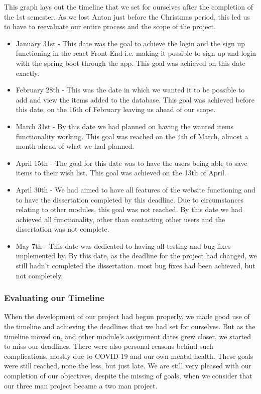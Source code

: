 This graph lays out the timeline that we set for ourselves after the completion of the 1st semester. As we lost Anton just before the Christmas period, this led us to have to reevaluate our entire process and the scope of the project. 
\begin{itemize}
    \item January 31st - This date was the goal to achieve the login and the sign up functioning in the react Front End i.e. making it possible to sign up and login with the spring boot through the app. This goal was achieved on this date exactly.
    \item February 28th - This was the date in which we wanted it to be possible to add and view the items added to the database. This goal was achieved before this date, on the 16th of February leaving us ahead of our scope.
    \item March 31st - By this date we had planned on having the wanted items functionality working. This goal was reached on the 4th of March, almost a month ahead of what we had planned.
    \item April 15th - The goal for this date was to have the users being able to save items to their wish list. This goal was achieved on the 13th of April.
    \item April 30th - We had aimed to have all features of the website functioning and to have the dissertation completed by this deadline. Due to circumstances relating to other modules, this goal was not reached. By this date we had achieved all functionality, other than contacting other users and the dissertation was not complete.
    \item May 7th - This date was dedicated to having all testing and bug fixes implemented by. By this date, as the deadline for the project had changed, we still hadn't completed the dissertation. most bug fixes had been achieved, but not completely.
\end{itemize}

\subsubsection{Evaluating our Timeline}
When the development of our project had begun properly, we made good use of the timeline and achieving the deadlines that we had set for ourselves. But as the timeline moved on, and other module's assignment dates grew closer, we started to miss our deadlines. There were also personal reasons behind such complications, mostly due to COVID-19 and our own mental health. These goals were still reached, none the less, but just late. We are still very pleased with our completion of our objectives, despite the missing of goals, when we consider that our three man project became a two man project.

